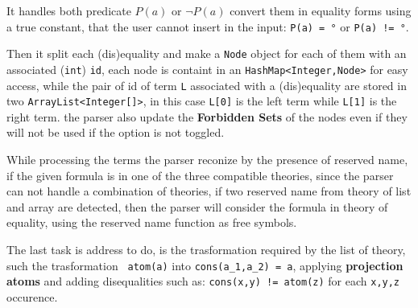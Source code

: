 \documentclass[11pt,a4paper]{article}
\begin{document}
\begin{enumerate}
        It handles both predicate $P(a)$ or $\lnot P(a)$ convert them in equality forms using a 
        true constant, that the user cannot insert in the input: \texttt{P(a) = °} or 
        \texttt{P(a) != °}.

        Then it split each (dis)equality and make a \texttt{Node} object for each of them with 
        an associated (\texttt{int}) \texttt{id}, each node is containt in an 
        \texttt{HashMap<Integer,Node>} for easy access, while the pair of id of term \texttt{L} 
        associated with a (dis)equality are stored in two \texttt{ArrayList<Integer[]>}, 
        in this case \texttt{L[0]} is the left term while \texttt{L[1]} is the right term.
        the parser also update the \textbf{Forbidden Sets} of the nodes even if they will 
        not be used if the option is not toggled.

        While processing the terms the parser reconize by the presence of reserved name, 
        if the given formula is in one of the three compatible theories, since the parser can not 
        handle a combination of theories, if two reserved name from theory of list and array are 
        detected, then the parser will consider the formula in theory of equality, using the 
        reserved name function as free symbols.
        
        The last task is address to do, is the trasformation required by the list of theory, 
        such the trasformation \texttt{~atom(a)} into \texttt{cons(a\_1,a\_2) = a}, applying 
        \textbf{projection atoms} and adding disequalities such as: \texttt{cons(x,y) != atom(z)} 
        for each \texttt{x,y,z} occurence. 

    \end{enumerate}
\end{document}
